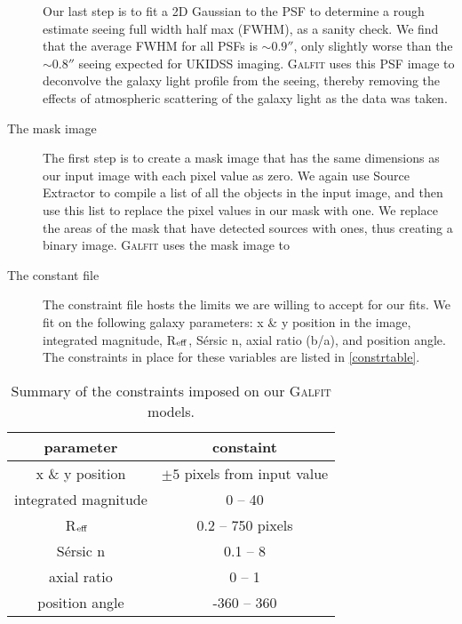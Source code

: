 \documentclass[iop,apj,twocolappendix]{emulateapj}
\newcommand{\Reff}{R$_{\rm eff}$}
\begin{document}
\begin{description}
{\begin{enumerate}
\end{enumerate}

\noindent Our last step is to fit a 2D Gaussian to the PSF to determine a rough estimate seeing full width half max (FWHM), as a sanity check. We find that the average FWHM for all PSFs is $\sim 0.9''$, only slightly worse than the $\sim 0.8''$ seeing expected for UKIDSS imaging. \textsc{Galfit} uses this PSF image to deconvolve the galaxy light profile from the seeing, thereby removing the effects of atmospheric scattering of the galaxy light as the data was taken.}

\item[The mask image]{The first step is to create a mask image that has the same dimensions as our input image with each pixel value as zero. We again use Source Extractor to compile a list of all the objects in the input image, and then use this list to replace the pixel values in our mask with one. We replace the areas of the mask that have detected sources with ones, thus creating a binary image. \textsc{Galfit} uses the mask image to }

\item[The constant file]{The constraint file hosts the limits we are willing to accept for our fits. We fit on the following galaxy parameters: x \& y position in the image, integrated magnitude, \Reff, S\'ersic n, axial ratio (b/a), and position angle. The constraints in place for these variables are listed in \autoref{constrtable}.}

\end{description}
 
\begin{table}[htdp]
\begin{center}
\begin{tabular}{cc} \hline
parameter & constaint  \\ \hline
x \& y position & $\pm5$ pixels from input value \\
integrated magnitude & 0 -- 40 \\ 
\Reff\ & 0.2 -- 750 pixels \\ 
S\'ersic n & 0.1 -- 8 \\ 
axial ratio & 0 -- 1 \\
position angle & -360 -- 360 \\ \hline

\end{tabular}
\end{center}
\caption{Summary of the constraints imposed on our \textsc{Galfit} models.}
\label{constrtable}
\end{table}%
\end{document}
